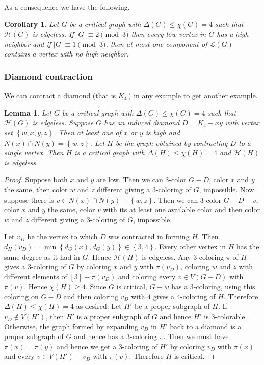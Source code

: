 \documentclass[12pt]{article}
\theoremstyle{plain}
\newtheorem{lem}[thm]{Lemma}
\newtheorem{cor}[thm]{Corollary}
\theoremstyle{definition}
\theoremstyle{remark}
\newcommand{\fancy}[1]{\mathcal{#1}}
\renewcommand{\L}{\fancy{L}}
\newcommand{\HH}{\fancy{H}}
\newcommand{\set}[1]{\left\{ #1 \right\}}
\newcommand{\card}[1]{\left|#1\right|}
\newcommand{\irange}[1]{\left[#1\right]}
\begin{document}
\noindent As a consequence we have the following.

\begin{cor}\label{LowLowNeighborhood}
Let $G$ be a critical graph with $\Delta(G) \leq \chi(G) = 4$ such that $\HH(G)$ is edgeless.  If $\card{G} \equiv 2 \pmod{3}$ then every low vertex in $G$ has a high neighbor and if $\card{G} \equiv 1 \pmod{3}$, then at most one component of $\L(G)$ contains a vertex with no high neighbor.
\end{cor}

\subsubsection{Diamond contraction}
We can contract a diamond (that is $K_4^-$) in any example to get another example.

\begin{lem}\label{DiamondContraction}
Let $G$ be a critical graph with $\Delta(G) \leq \chi(G) = 4$ such that $\HH(G)$ is edgeless.  Suppose $G$ has an induced diamond $D = K_4 - xy$ with vertex set $\set{w, x, y, z}$.  Then at least one of $x$ or $y$ is high and $N(x) \cap N(y) = \set{w, z}$.  Let $H$ be the graph obtained by contracting $D$ to a single vertex.  Then $H$ is a critical graph with $\Delta(H) \leq \chi(H) = 4$ and $\HH(H)$ is edgeless. 
\end{lem}
\begin{proof}
Suppose both $x$ and $y$ are low.  Then we can $3$-color $G-D$, color $x$ and $y$ the same, then color $w$ and $z$ different giving a $3$-coloring of $G$, impossible.  Now suppose there is $v \in N(x) \cap N(y) - \set{w, z}$.  Then we can $3$-color $G - D - v$, color $x$ and $y$ the same, color $v$ with its at least one available color and then color $w$ and $z$ different giving a $3$-coloring of $G$, impossible.

Let $v_D$ be the vertex to which $D$ was contracted in forming $H$.  Then $d_H(v_D) = \min\set{d_G(x), d_G(y)} \in \set{3,4}$.  Every other vertex in $H$ has the same degree as it had in $G$.  Hence  $\HH(H)$ is edgeless.   Any $3$-coloring $\pi$ of $H$ gives a $3$-coloring of $G$ by coloring $x$ and $y$ with $\pi(v_D)$, coloring $w$ and $z$ with different elements of $\irange{3} - \pi(v_D)$ and coloring every $v \in V(G-D)$ with $\pi(v)$.  Hence $\chi(H) \geq 4$.  Since $G$ is critical, $G-w$ has a $3$-coloring, using this coloring on $G-D$ and then coloring $v_D$ with $4$ gives a $4$-coloring of $H$.  Therefore $\Delta(H) \leq \chi(H) = 4$ as desired.  Let $H'$ be a proper subgraph of $H$.  If $v_D \not \in V(H')$, then $H'$ is a proper subgraph of $G$ and hence $H'$ is $3$-colorable.  Otherwise, the graph formed by expanding $v_D$ in $H'$ back to a diamond is a proper subgraph of $G$ and hence has a $3$-coloring $\pi$.  Then we must have $\pi(x) = \pi(y)$ and hence we get a $3$-coloring of $H'$ by coloring $v_D$ with $\pi(x)$ and every $v \in V(H')-v_D$ with $\pi(v)$.  Therefore $H$ is critical.
\end{proof}
\end{document}
